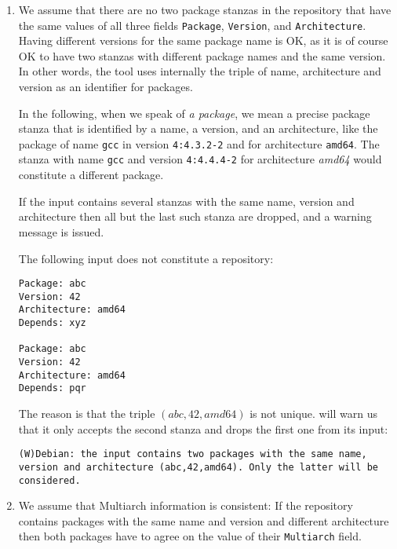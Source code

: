 \begin{enumerate}
\item
  We assume that there are no two package stanzas in the repository
  that have the same values of all three fields \texttt{Package},
  \texttt{Version}, and \texttt{Architecture}. Having different
  versions for the same package name is OK, as it is of course OK to
  have two stanzas with different package names and the same version.
  In other words, the \debcheck{} tool uses internally the triple of
  name, architecture and version as an identifier for packages.

  In the following, when we speak of \emph{a package}, we mean a
  precise package stanza that is identified by a name, a version, and
  an architecture, like the package of name \texttt{gcc} in version
  \texttt{4:4.3.2-2} and for architecture \texttt{amd64}. The stanza with name
  \texttt{gcc} and version \texttt{4:4.4.4-2} for architecture
  \textit{amd64} would constitute a different package.

  If the input contains several stanzas with the same name, version
  and architecture then all but the last such stanza are dropped, and a 
  warning message is issued.

\begin{example} The following input does not constitute a repository:
\begin{verbatim}
Package: abc
Version: 42
Architecture: amd64
Depends: xyz

Package: abc
Version: 42
Architecture: amd64
Depends: pqr
\end{verbatim}
The reason is that the triple $(abc,42,amd64)$ is not
unique. \debcheck{} will warn us that it only accepts the second
stanza and drops the first one from its input:
\begin{verbatim}
(W)Debian: the input contains two packages with the same name, version and architecture (abc,42,amd64). Only the latter will be considered.
\end{verbatim}
\end{example}

\item
  We assume that Multiarch information is consistent: If the
  repository contains packages with the same name and version and
  different architecture then both packages have to agree on the value
  of their \texttt{Multiarch} field.

\end{enumerate}


